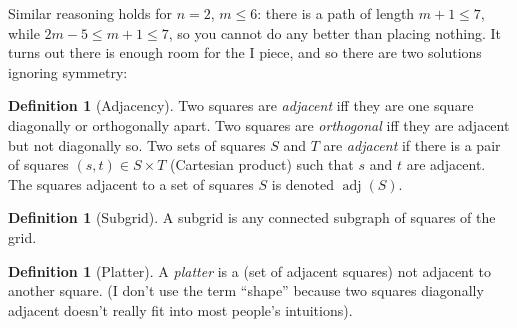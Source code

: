 \documentclass{article}
\theoremstyle{definition}%
\newtheorem{definition}[theorem]{Definition}
\newcommand{\newterm}[1]{\textit{#1}}
\newcommand{\adj}{\operatorname{adj}}
\begin{document}
Similar reasoning holds for $n = 2$, $m \le 6$: there is a path of length $m + 1 \le 7$, while $2m - 5 \le m + 1 \le 7$, so you cannot do any better than placing nothing. It turns out there is enough room for the I piece, and so there are two solutions ignoring symmetry:

\begin{figure}[htbp]
    \centering
    \label{fig:no2x5}
\end{figure}

\begin{definition}[Adjacency]
Two squares are \newterm{adjacent} iff they are one square diagonally or orthogonally apart. Two squares are \newterm{orthogonal} iff they are adjacent but not diagonally so. Two sets of squares $S$ and $T$ are \newterm{adjacent} if there is a pair of squares $(s, t) \in S \times T$ (Cartesian product) such that $s$ and $t$ are adjacent. The squares adjacent to a set of squares $S$ is denoted $\adj(S)$.
\end{definition}

\begin{definition}[Subgrid]
A subgrid is any connected subgraph of squares of the grid.
\end{definition}

\begin{definition}[Platter]
A \newterm{platter} is a (set of adjacent squares) not adjacent to another square. (I don't use the term ``shape'' because two squares diagonally adjacent doesn't really fit into most people's intuitions).%
\end{definition}
\end{document}

